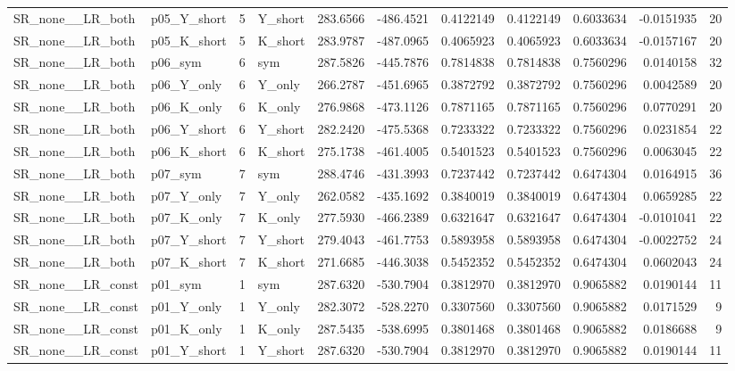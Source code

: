 \begin{table}[!h]
\begin{tabular}[t]{llrlrrrrrrr}
SR\_none\_\_LR\_both & p05\_Y\_short & 5 & Y\_short & 283.6566 & -486.4521 & 0.4122149 & 0.4122149 & 0.6033634 & -0.0151935 & 20\\
SR\_none\_\_LR\_both & p05\_K\_short & 5 & K\_short & 283.9787 & -487.0965 & 0.4065923 & 0.4065923 & 0.6033634 & -0.0157167 & 20\\
\addlinespace
SR\_none\_\_LR\_both & p06\_sym & 6 & sym & 287.5826 & -445.7876 & 0.7814838 & 0.7814838 & 0.7560296 & 0.0140158 & 32\\
SR\_none\_\_LR\_both & p06\_Y\_only & 6 & Y\_only & 266.2787 & -451.6965 & 0.3872792 & 0.3872792 & 0.7560296 & 0.0042589 & 20\\
SR\_none\_\_LR\_both & p06\_K\_only & 6 & K\_only & 276.9868 & -473.1126 & 0.7871165 & 0.7871165 & 0.7560296 & 0.0770291 & 20\\
SR\_none\_\_LR\_both & p06\_Y\_short & 6 & Y\_short & 282.2420 & -475.5368 & 0.7233322 & 0.7233322 & 0.7560296 & 0.0231854 & 22\\
SR\_none\_\_LR\_both & p06\_K\_short & 6 & K\_short & 275.1738 & -461.4005 & 0.5401523 & 0.5401523 & 0.7560296 & 0.0063045 & 22\\
\addlinespace
SR\_none\_\_LR\_both & p07\_sym & 7 & sym & 288.4746 & -431.3993 & 0.7237442 & 0.7237442 & 0.6474304 & 0.0164915 & 36\\
SR\_none\_\_LR\_both & p07\_Y\_only & 7 & Y\_only & 262.0582 & -435.1692 & 0.3840019 & 0.3840019 & 0.6474304 & 0.0659285 & 22\\
SR\_none\_\_LR\_both & p07\_K\_only & 7 & K\_only & 277.5930 & -466.2389 & 0.6321647 & 0.6321647 & 0.6474304 & -0.0101041 & 22\\
SR\_none\_\_LR\_both & p07\_Y\_short & 7 & Y\_short & 279.4043 & -461.7753 & 0.5893958 & 0.5893958 & 0.6474304 & -0.0022752 & 24\\
SR\_none\_\_LR\_both & p07\_K\_short & 7 & K\_short & 271.6685 & -446.3038 & 0.5452352 & 0.5452352 & 0.6474304 & 0.0602043 & 24\\
\addlinespace
SR\_none\_\_LR\_const & p01\_sym & 1 & sym & 287.6320 & -530.7904 & 0.3812970 & 0.3812970 & 0.9065882 & 0.0190144 & 11\\
SR\_none\_\_LR\_const & p01\_Y\_only & 1 & Y\_only & 282.3072 & -528.2270 & 0.3307560 & 0.3307560 & 0.9065882 & 0.0171529 & 9\\
SR\_none\_\_LR\_const & p01\_K\_only & 1 & K\_only & 287.5435 & -538.6995 & 0.3801468 & 0.3801468 & 0.9065882 & 0.0186688 & 9\\
SR\_none\_\_LR\_const & p01\_Y\_short & 1 & Y\_short & 287.6320 & -530.7904 & 0.3812970 & 0.3812970 & 0.9065882 & 0.0190144 & 11\\

\end{tabular}
\end{table}
